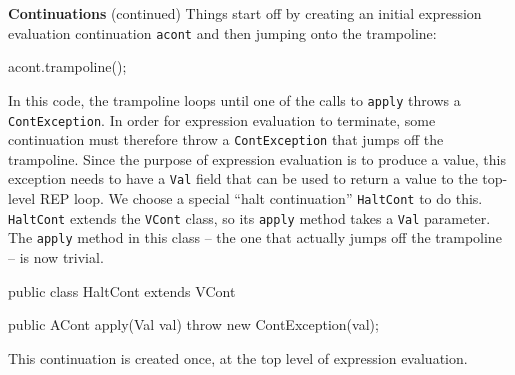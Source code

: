 \begin{minipage}[t]{\sw}
\slidenumber
\LARGE
{\bf Continuations} (continued)\exx
Things start off by creating an initial
expression evaluation continuation \verb'acont'
and then jumping onto the trampoline:
\Large
\begin{qv}
acont.trampoline();
\end{qv}
\LARGE
In this code, the trampoline loops
until one of the calls to \verb'apply' throws a \verb'ContException'.
In order for expression evaluation to terminate,
some continuation must therefore throw a \verb'ContException'
that jumps off the trampoline.
Since the purpose of expression evaluation is
to produce a value, 
this exception needs to have a \verb'Val' field
that can be used to return a value to the top-level REP loop.\exx
We choose a special ``halt continuation'' \verb'HaltCont' to do this. 
\verb'HaltCont' extends the \verb'VCont' class,
so its \verb'apply' method takes a \verb'Val' parameter.
The \verb'apply' method in this class --
the one that actually jumps off the trampoline --
is now trivial.
\Large
\begin{qv}
public class HaltCont extends VCont {

    public ACont apply(Val val) {
        throw new ContException(val);
    }

}
\end{qv}
\LARGE
This continuation is created once,
at the top level of expression evaluation.
\end{minipage}
